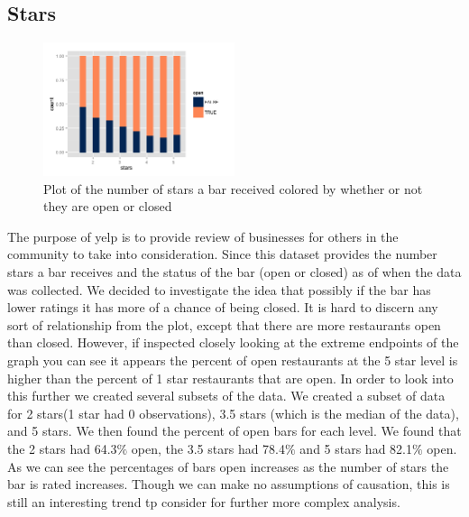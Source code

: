 \documentclass[11pt]{article}
\begin{document}
\subsection{Stars}
\begin{figure}[h!]
  \caption{Plot of the number of stars a bar received colored by whether or not they are open or closed}
  \centering
  \label{open}
    \includegraphics[width=0.5\textwidth]{Figures/barstatus.png}
\end{figure}
The purpose of yelp is to provide review of businesses for others in the community to take into consideration.  Since this dataset provides the number stars a bar receives and the status of the bar (open or closed) as of when the data was collected.  We decided to investigate the idea that possibly if the bar has lower ratings it has more of a chance of being closed.  It is hard to discern any sort of relationship from the plot, except that there are more restaurants open than closed.  However, if inspected closely looking at the extreme endpoints of the graph you can see it appears the percent of open restaurants at the 5 star level is higher than the percent of 1 star restaurants that are open. In order to look into this further we created several subsets of the data.  We created a subset of data for 2 stars(1 star had 0 observations), 3.5 stars (which is the median of the data), and 5 stars.  We then found the percent of open bars for each level.  We found that the 2 stars had 64.3$\%$ open, the 3.5 stars had 78.4$\%$ and 5 stars had 82.1$\%$ open.  As we can see the percentages of bars open increases as the number of stars the bar is rated increases.  Though we can make no assumptions of causation, this is still an interesting trend tp consider for further more complex analysis.
\end{document}
